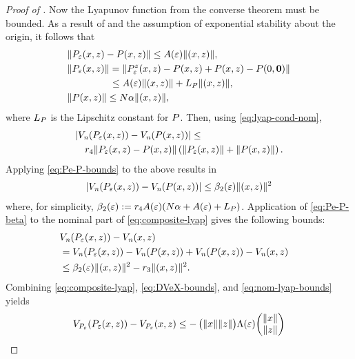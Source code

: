 \documentclass[twocolumn]{article}
\begin{document}
\begin{proof} [Proof of ]
  Now the Lyapunov function from the converse theorem must be bounded.
  As a result of  and the assumption of exponential stability about the origin, it follows that
  \begin{align}
    \label{eq:Pe-P-bounds}
    &\| \Pe\argsxz - \P\argsxz \| \leq \Ae \nzdxz,\\
    \nonumber
    &\| \Pe\argsxz \| = \| \Pez\argsxz - \P\argsxz + \P\argsxz - \P\argszero\|\\
    \nonumber
    & \hspace{4.4em} \leq \Ae \nzdxz  + \LP\nzdxz,\\
    \nonumber
    &\| \P\argsxz \| \leq N \alpha \nzdxz,
  \end{align}
  where $\LP$ is the Lipschitz constant for $\P$.
  Then, using \eqref{eq:lyap-cond-nom},
  \begin{align}
    \lefteqn{| \Vn(\Pe\argsxz) - \Vn(\P\argsxz) | \leq}\\
    \nonumber
    &&r_{4} \| \Pe\argsxz - \P\argsxz \| \left( \|\Pe\argsxz\| + \|\P\argsxz\| \right).
  \end{align}
  Applying \eqref{eq:Pe-P-bounds} to the above results in
  \begin{align}
    \label{eq:Pe-P-beta}
    | \Vn(\Pe\argsxz) - \Vn(\P\argsxz) | \leq \bepstwo \nzdxz^{2}
  \end{align}
  where, for simplicity, $\bepstwo := r_{4} \Ae (N \alpha + \Ae  + \LP)$.
  Application of \eqref{eq:Pe-P-beta} to the nominal part of \eqref{eq:composite-lyap} gives the following bounds:
  \begin{align}
    \label{eq:nom-lyap-bounds}
    \lefteqn{\Vn(\Pe\argsxz) - \Vn\argsxz }\\
    \nonumber
    &= \Vn(\Pe\argsxz) - \Vn(\P\argsxz) + \Vn(\P\argsxz) - \Vn\argsxz\\
    \nonumber
    &\leq \bepstwo \nzdxz^{2} - r_{3} \nzdxz^{2}.
  \end{align}
  Combining \eqref{eq:composite-lyap}, \eqref{eq:DVeX-bounds}, and \eqref{eq:nom-lyap-bounds} yields
  \begin{align}
    \VP(\Pe\argsxz) - \VP\argsxz \leq
    -\left(\!\!\!\begin{array}{c c}
      \nzdx\!\!\! & \!\!\!\nzdz
    \end{array}\!\!\!\right)
    \!\Le\!
    \left(\!\!\!\begin{array}{c}
        \nzdx\\
        \nzdz
    \end{array}\!\!\!\right)

\end{align}
\end{proof}
\end{document}
